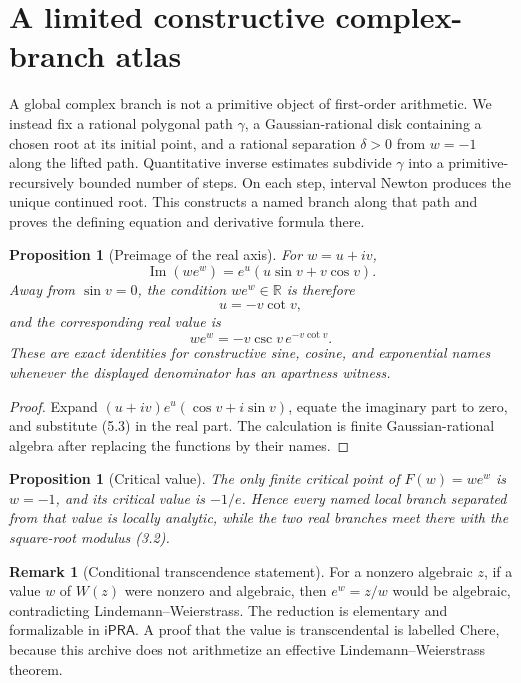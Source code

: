 \documentclass[11pt]{article}
\newtheorem{proposition}[theorem]{Proposition}
\theoremstyle{definition}
\newtheorem{remark}[theorem]{Remark}
\newcommand{\R}{\mathbb R}
\newcommand{\iPRA}{\mathsf{iPRA}}
\newcommand{\StatusC}{\textsf{C}}
\begin{document}
\section{A limited constructive complex-branch atlas}\label{sec:complex}

A global complex branch is not a primitive object of first-order arithmetic.
We instead fix a rational polygonal path \(\gamma\), a Gaussian-rational disk
containing a chosen root at its initial point, and a rational separation
\(\delta>0\) from \(w=-1\) along the lifted path.  Quantitative inverse
estimates subdivide \(\gamma\) into a primitive-recursively bounded number of
steps.  On each step, interval Newton produces the unique continued root.  This
constructs a named branch along that path and proves the defining equation and
derivative formula there.

\begin{proposition}[Preimage of the real axis]\label{prop:quadratrix}
For \(w=u+iv\),
\[
 \operatorname{Im}(we^w)=e^u(u\sin v+v\cos v).
\]
Away from \(\sin v=0\), the condition \(we^w\in\R\) is therefore
\[
 u=-v\cot v,
 \tag{5.3}
\]
and the corresponding real value is
\[
 we^w=-v\csc v\,e^{-v\cot v}.
 \tag{5.4}
\]
These are exact identities for constructive sine, cosine, and exponential
names whenever the displayed denominator has an apartness witness.
\end{proposition}

\begin{proof}
Expand
\((u+iv)e^u(\cos v+i\sin v)\), equate the imaginary part to zero, and
substitute (5.3) in the real part.  The calculation is finite Gaussian-rational
algebra after replacing the functions by their names.
\end{proof}

\begin{proposition}[Critical value]\label{prop:critical}
The only finite critical point of \(F(w)=we^w\) is \(w=-1\), and its critical
value is \(-1/e\).  Hence every named local branch separated from that value is
locally analytic, while the two real branches meet there with the square-root
modulus (3.2).
\end{proposition}

\begin{remark}[Conditional transcendence statement]
For a nonzero algebraic \(z\), if a value \(w\) of \(W(z)\) were nonzero and
algebraic, then \(e^w=z/w\) would be algebraic, contradicting
Lindemann--Weierstrass.  The reduction is elementary and formalizable in
\(\iPRA\).  A proof that the value is transcendental is labelled \StatusC here,
because this archive does not arithmetize an effective
Lindemann--Weierstrass theorem.
\end{remark}
\end{document}
